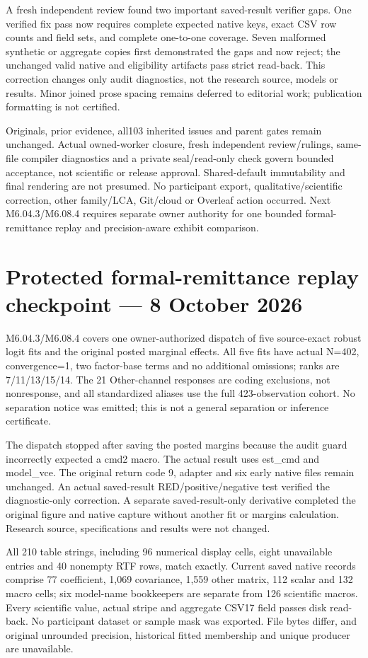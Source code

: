 \documentclass[11pt,a4paper]{article}
\begin{document}
A fresh independent review found two important saved-result verifier gaps.
One verified fix pass now requires complete expected native keys, exact CSV
row counts and field sets, and complete one-to-one coverage. Seven malformed
synthetic or aggregate copies first demonstrated the gaps and now reject;
the unchanged valid native and eligibility artifacts pass strict read-back.
This correction changes only audit diagnostics, not the research source,
models or results. Minor joined prose spacing remains deferred to editorial
work; publication formatting is not certified.

Originals, prior evidence, all103 inherited issues and parent gates remain
unchanged. Actual owned-worker closure, fresh independent review/rulings,
same-file compiler diagnostics and a private seal/read-only check govern
bounded acceptance, not scientific or release approval. Shared-default
immutability and final rendering are not presumed. No participant export,
qualitative/scientific correction, other family/LCA, Git/cloud or Overleaf
action occurred. Next M6.04.3/M6.08.4 requires separate owner authority for
one bounded formal-remittance replay and precision-aware exhibit comparison.
\section*{Protected formal-remittance replay checkpoint --- 8 October 2026}
M6.04.3/M6.08.4 covers one owner-authorized dispatch of five source-exact
robust logit fits and the original posted marginal effects. All five fits
have actual N=402, convergence=1, two factor-base terms and no additional
omissions; ranks are 7/11/13/15/14. The 21 Other-channel responses are coding
exclusions, not nonresponse, and all standardized aliases use the full
423-observation cohort. No separation notice was emitted; this is not a
general separation or inference certificate.

The dispatch stopped after saving the posted margins because the audit
guard incorrectly expected a cmd2 macro. The actual result uses est\_cmd
and model\_vce. The original return code 9, adapter and six early native
files remain unchanged. An actual saved-result RED/positive/negative test
verified the diagnostic-only correction. A separate saved-result-only
derivative completed the original figure and native capture without another
fit or margins calculation. Research source, specifications and results
were not changed.

All 210 table strings, including 96 numerical display cells, eight
unavailable entries and 40 nonempty RTF rows, match exactly. Current saved
native records comprise 77 coefficient, 1,069 covariance, 1,559 other
matrix, 112 scalar and 132 macro cells; six model-name bookkeepers are
separate from 126 scientific macros. Every scientific value, actual stripe
and aggregate CSV17 field passes disk read-back. No participant dataset or
sample mask was exported. File bytes differ, and original unrounded
precision, historical fitted membership and unique producer are unavailable.
\end{document}
